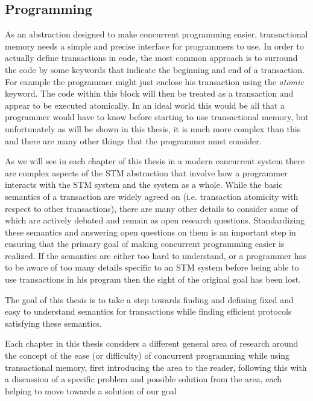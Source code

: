 \subsection{Programming}
As an abstraction designed to make concurrent programming easier, transactional memory needs a
simple and precise interface for programmers to use.
In order to actually define transactions in code, the most common
approach is to surround the code by some keywords that indicate the beginning and end of a transaction.
For example the programmer might just enclose his transaction using the \emph{atomic} keyword.
The code within this block will then be treated as a transaction and appear to be executed atomically.
In an ideal world this would be all that a programmer would have to know before starting to use
transactional memory, but unfortunately as will be shown in this thesis, it is much more complex than this
and there are many other things that the programmer must consider.



As we will see in each chapter of this thesis  in a modern concurrent system
there are complex aspects
of the STM abstraction that involve how a programmer interacts with the
STM system and the system as a whole.
While the basic semantics of a transaction are widely agreed on
(i.e. transaction atomicity with respect to other transactions),
there are many other details to consider
some of which are actively debated and remain as open research questions.
Standardizing these semantics and answering open questions on them is an important
step in ensuring that the primary goal of making concurrent programming easier
is realized.
If the semantics are either too hard to understand, or a programmer has to be aware of
too many details specific to an STM system before being able to use transactions in
his program then the sight of the original goal has been lost.


The goal of this thesis is to take a step towards finding and defining fixed and easy to understand semantics
for transactions while finding efficient protocols satisfying these semantics.



Each chapter in this thesis considers a different general area of research around
the concept of the ease (or difficulty) of concurrent programming while using transactional memory, first introducing
the area to the reader, following this with a discussion of a specific problem
and possible solution from the area, each helping to move towards a solution of our goal







